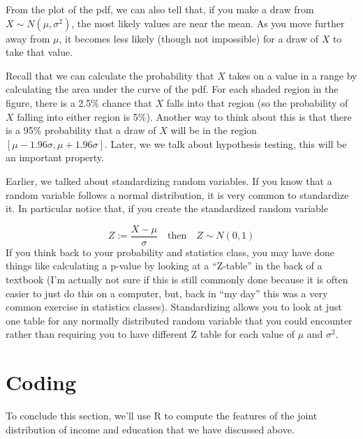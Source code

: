 \documentclass[
  letterpaper,
  DIV=11,
  numbers=noendperiod]{scrreprt}
\newenvironment{Shaded}{\begin{snugshade}}{\end{snugshade}}
\newcommand{\CommentTok}[1]{\textcolor[rgb]{0.37,0.37,0.37}{#1}}
\newcommand{\FunctionTok}[1]{\textcolor[rgb]{0.28,0.35,0.67}{#1}}
\newcommand{\NormalTok}[1]{\textcolor[rgb]{0.00,0.23,0.31}{#1}}
\newcommand{\OtherTok}[1]{\textcolor[rgb]{0.00,0.23,0.31}{#1}}
\newcommand{\SpecialCharTok}[1]{\textcolor[rgb]{0.37,0.37,0.37}{#1}}
\begin{document}
From the plot of the pdf, we can also tell that, if you make a draw from
\(X \sim N(\mu,\sigma^2)\), the most likely values are near the mean. As
you move further away from \(\mu\), it becomes less likely (though not
impossible) for a draw of \(X\) to take that value.

Recall that we can calculate the probability that \(X\) takes on a value
in a range by calculating the area under the curve of the pdf. For each
shaded region in the figure, there is a 2.5\% chance that \(X\) falls
into that region (so the probability of \(X\) falling into either region
is 5\%). Another way to think about this is that there is a 95\%
probability that a draw of \(X\) will be in the region
\([\mu-1.96\sigma, \mu+1.96\sigma]\). Later, we we talk about hypothesis
testing, this will be an important property.

Earlier, we talked about standardizing random variables. If you know
that a random variable follows a normal distribution, it is very common
to standardize it. In particular notice that, if you create the
standardized random variable

\[
  Z := \frac{X - \mu}{\sigma} \quad \textrm{then} \quad Z \sim N(0,1)
\] If you think back to your probability and statistics class, you may
have done things like calculating a p-value by looking at a ``Z-table''
in the back of a textbook (I'm actually not sure if this is still
commonly done because it is often easier to just do this on a computer,
but, back in ``my day'' this was a very common exercise in statistics
classes). Standardizing allows you to look at just one table for any
normally distributed random variable that you could encounter rather
than requiring you to have different Z table for each value of \(\mu\)
and \(\sigma^2\).

\section{Coding}\label{coding}

To conclude this section, we'll use R to compute the features of the
joint distribution of income and education that we have discussed above.

\begin{Shaded}
\end{Shaded}
\end{document}
